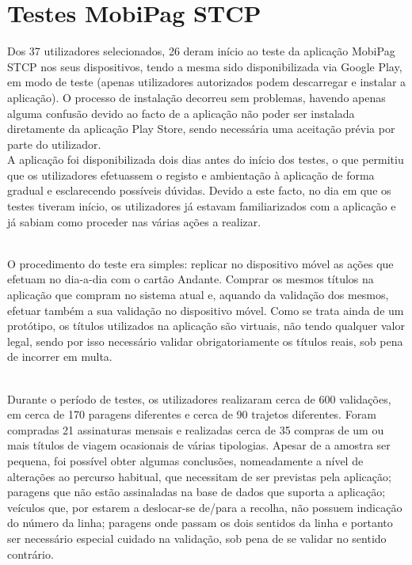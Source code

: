 \section{Testes MobiPag STCP}

Dos 37 utilizadores selecionados, 26 deram início ao teste da aplicação MobiPag STCP nos seus dispositivos, tendo a mesma sido disponibilizada via Google Play, em modo de teste (apenas utilizadores autorizados podem descarregar e instalar a aplicação). O processo de instalação decorreu sem problemas, havendo apenas alguma confusão devido ao facto de a aplicação não poder ser instalada diretamente da aplicação Play Store, sendo necessária uma aceitação prévia por parte do utilizador.
\\A aplicação foi disponibilizada dois dias antes do início dos testes, o que permitiu que os utilizadores efetuassem o registo e ambientação à aplicação de forma gradual e esclarecendo possíveis dúvidas. Devido a este facto, no dia em que os testes tiveram início, os utilizadores já estavam familiarizados com a aplicação e já sabiam como proceder nas várias ações a realizar.

~\\O procedimento do teste era simples: replicar no dispositivo móvel as ações que efetuam no dia-a-dia com o cartão Andante. Comprar os mesmos títulos na aplicação que compram no sistema atual e, aquando da validação dos mesmos, efetuar também a sua validação no dispositivo móvel. Como se trata ainda de um protótipo, os títulos utilizados na aplicação são virtuais, não tendo qualquer valor legal, sendo por isso necessário validar obrigatoriamente os títulos reais, sob pena de incorrer em multa.

~\\Durante o período de testes, os utilizadores realizaram cerca de 600 validações, em cerca de 170 paragens diferentes e cerca de 90 trajetos diferentes. Foram compradas 21 assinaturas mensais e realizadas cerca de 35 compras de um ou mais títulos de viagem ocasionais de várias tipologias. Apesar de a amostra ser pequena, foi possível obter algumas conclusões, nomeadamente a nível de alterações ao percurso habitual, que necessitam de ser previstas pela aplicação; paragens que não estão assinaladas na base de dados que suporta a aplicação; veículos que, por estarem a deslocar-se de/para a recolha, não possuem indicação do número da linha; paragens onde passam os dois sentidos da linha e portanto ser necessário especial cuidado na validação, sob pena de se validar no sentido contrário.


